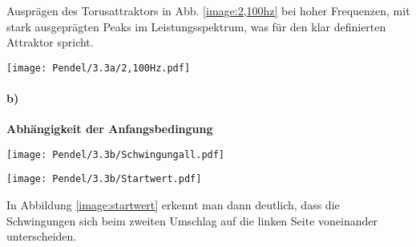 Ausprägen des Torusattraktors in Abb. \ref{image:2,100hz} bei hoher Frequenzen, mit stark ausgeprägten Peaks im Leistungsspektrum, was für den klar definierten Attraktor spricht.
\begin{center}
    \texttt{[image: Pendel/3.3a/2,100Hz.pdf]}
    \label{image:2,100hz}
\end{center}
\newpage
\paragraph{b)} \textbf{Abhängigkeit der Anfangsbedingung}\\
\begin{center}
    \texttt{[image: Pendel/3.3b/Schwingungall.pdf]}
    \label{image:allData}
\end{center}
\begin{center}
    \texttt{[image: Pendel/3.3b/Startwert.pdf]}
    \label{image:startwert}
\end{center}
In Abbildung \ref{image:startwert} erkennt man dann deutlich, dass die Schwingungen sich beim zweiten Umschlag auf die linken Seite voneinander unterscheiden. 